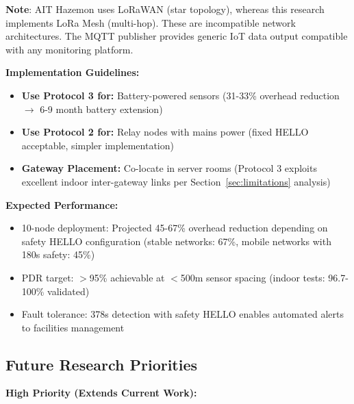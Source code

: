 \textbf{Note}: AIT Hazemon uses LoRaWAN (star topology), whereas this research implements LoRa Mesh (multi-hop). These are incompatible network architectures. The MQTT publisher provides generic IoT data output compatible with any monitoring platform.

\textbf{Implementation Guidelines:}
\begin{itemize}
\item \textbf{Use Protocol 3 for:} Battery-powered sensors (31-33\% overhead reduction $\rightarrow$ 6-9 month battery extension)
\item \textbf{Use Protocol 2 for:} Relay nodes with mains power (fixed HELLO acceptable, simpler implementation)
\item \textbf{Gateway Placement:} Co-locate in server rooms (Protocol 3 exploits excellent indoor inter-gateway links per Section~\ref{sec:limitations} analysis)
\end{itemize}

\textbf{Expected Performance:}
\begin{itemize}
\item 10-node deployment: Projected 45-67\% overhead reduction depending on safety HELLO configuration (stable networks: 67\%, mobile networks with 180s safety: 45\%)
\item PDR target: $>$95\% achievable at $<$500m sensor spacing (indoor tests: 96.7-100\% validated)
\item Fault tolerance: 378s detection with safety HELLO enables automated alerts to facilities management
\end{itemize}

\subsection{Future Research Priorities}

\textbf{High Priority (Extends Current Work):}

